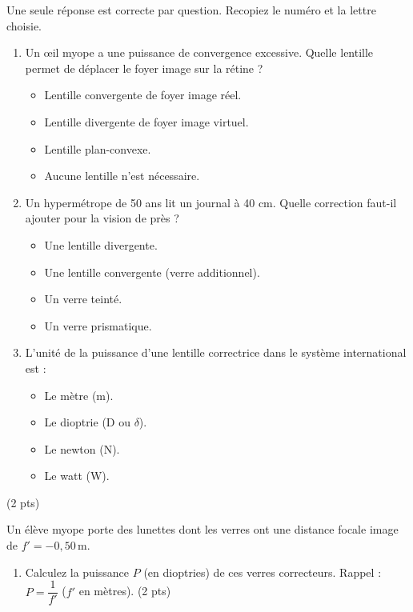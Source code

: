 \documentclass[11pt]{article}
\begin{document}
\begin{exercice}
Une seule réponse est correcte par question. Recopiez le numéro et la lettre choisie.
\begin{enumerate}
    \item Un œil myope a une puissance de convergence excessive. Quelle lentille permet de déplacer le foyer image sur la rétine ?
    \begin{itemize}
        \item[A.] Lentille convergente de foyer image réel.
        \item[B.] Lentille divergente de foyer image virtuel.
        \item[C.] Lentille plan-convexe.
        \item[D.] Aucune lentille n'est nécessaire.
    \end{itemize}
    \item Un hypermétrope de 50 ans lit un journal à 40 cm. Quelle correction faut-il ajouter pour la vision de près ?
    \begin{itemize}
        \item[A.] Une lentille divergente.
        \item[B.] Une lentille convergente (verre additionnel).
        \item[C.] Un verre teinté.
        \item[D.] Un verre prismatique.
    \end{itemize}
    \item L'unité de la puissance d'une lentille correctrice dans le système international est :
    \begin{itemize}
        \item[A.] Le mètre (m).
        \item[B.] Le dioptrie (D ou $\delta$).
        \item[C.] Le newton (N).
        \item[D.] Le watt (W).
    \end{itemize}
\end{enumerate}
\hfill (2 pts)
\end{exercice}

\begin{exercice}
Un élève myope porte des lunettes dont les verres ont une distance focale image de $f' = -0,50\,\text{m}$.
\begin{enumerate}
    \item Calculez la puissance $P$ (en dioptries) de ces verres correcteurs. Rappel : $P = \dfrac{1}{f'}$ ($f'$ en mètres). \hfill (2 pts)
\end{enumerate}
\end{exercice}
\end{document}
